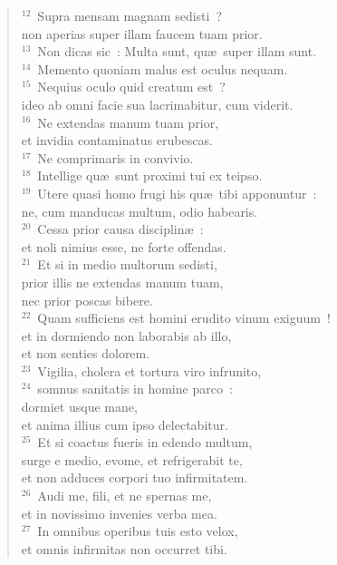 \begin{verse}${}^{12}$~Supra mensam magnam sedisti~?\\ non aperias super illam faucem tuam prior.\\
${}^{13}$~Non dicas sic~: Multa sunt, qu\ae\ super illam sunt.\\
${}^{14}$~Memento quoniam malus est oculus nequam.\\
${}^{15}$~Nequius oculo quid creatum est~?\\ ideo ab omni facie sua lacrimabitur, cum viderit.\\
${}^{16}$~Ne extendas manum tuam prior,\\ et invidia contaminatus erubescas.\\
${}^{17}$~Ne comprimaris in convivio.\\
${}^{18}$~Intellige qu\ae\ sunt proximi tui ex teipso.\\
${}^{19}$~Utere quasi homo frugi his qu\ae\ tibi apponuntur~:\\ ne, cum manducas multum, odio habearis.\\
${}^{20}$~Cessa prior causa disciplin\ae~:\\ et noli nimius esse, ne forte offendas.\\
${}^{21}$~Et si in medio multorum sedisti,\\ prior illis ne extendas manum tuam,\\ nec prior poscas bibere.\\
${}^{22}$~Quam sufficiens est homini erudito vinum exiguum~!\\ et in dormiendo non laborabis ab illo,\\ et non senties dolorem.\\
${}^{23}$~Vigilia, cholera et tortura viro infrunito,\\
${}^{24}$~somnus sanitatis in homine parco~:\\ dormiet usque mane,\\ et anima illius cum ipso delectabitur.\\
${}^{25}$~Et si coactus fueris in edendo multum,\\ surge e medio, evome, et refrigerabit te,\\ et non adduces corpori tuo infirmitatem.\\
${}^{26}$~Audi me, fili, et ne spernas me,\\ et in novissimo invenies verba mea.\\
${}^{27}$~In omnibus operibus tuis esto velox,\\ et omnis infirmitas non occurret tibi.\\

\end{verse}

